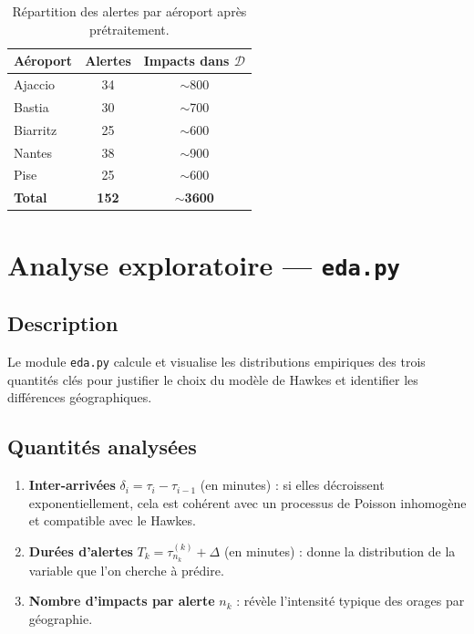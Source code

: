 \documentclass[a4paper,11pt]{article}
\begin{document}
\begin{table}[H]
\centering
\begin{tabular}{lcc}
\toprule
Aéroport & Alertes & Impacts dans $\mathcal{D}$ \\
\midrule
Ajaccio  & 34 & $\sim$800 \\
Bastia   & 30 & $\sim$700 \\
Biarritz & 25 & $\sim$600 \\
Nantes   & 38 & $\sim$900 \\
Pise     & 25 & $\sim$600 \\
\midrule
\textbf{Total} & \textbf{152} & $\sim$\textbf{3600} \\
\bottomrule
\end{tabular}
\caption{Répartition des alertes par aéroport après prétraitement.}
\label{tab:alertes}
\end{table}

\section{Analyse exploratoire --- \texttt{eda.py}}

\subsection{Description}

Le module \texttt{eda.py} calcule et visualise les distributions empiriques des trois quantités clés pour justifier le choix du modèle de Hawkes et identifier les différences géographiques.

\subsection{Quantités analysées}

\begin{enumerate}
    \item \textbf{Inter-arrivées} $\delta_i = \tau_i - \tau_{i-1}$ (en minutes) : si elles décroissent exponentiellement, cela est cohérent avec un processus de Poisson inhomogène et compatible avec le Hawkes.
    \item \textbf{Durées d'alertes} $T_k = \tau_{n_k}^{(k)} + \Delta$ (en minutes) : donne la distribution de la variable que l'on cherche à prédire.
    \item \textbf{Nombre d'impacts par alerte} $n_k$ : révèle l'intensité typique des orages par géographie.
\end{enumerate}
\end{document}
